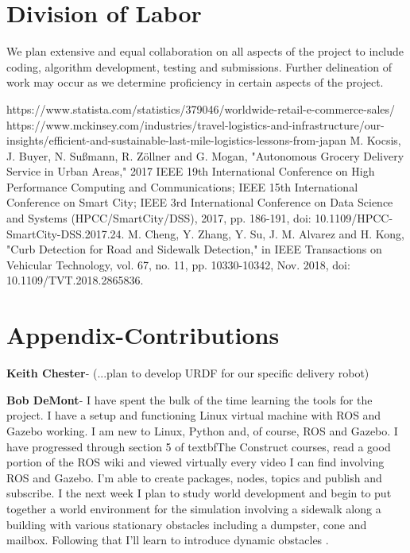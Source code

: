 \documentclass{article}
\begin{document}
\begin{multicols}{2}
\section*{Division of Labor}
We plan extensive and equal collaboration on all aspects of the project to include coding, algorithm development, testing and submissions. Further delineation of work may occur as we determine proficiency in certain aspects of the project.  
\label{References}


\begin{thebibliography}{10}
 https://www.statista.com/statistics/379046/worldwide-retail-e-commerce-sales/
https://www.mckinsey.com/industries/travel-logistics-and-infrastructure/our-insights/efficient-and-sustainable-last-mile-logistics-lessons-from-japan
M. Kocsis, J. Buyer, N. Sußmann, R. Zöllner and G. Mogan, "Autonomous Grocery Delivery Service in Urban Areas," 2017 IEEE 19th International Conference on High Performance Computing and Communications; IEEE 15th International Conference on Smart City; IEEE 3rd International Conference on Data Science and Systems (HPCC/SmartCity/DSS), 2017, pp. 186-191, doi: 10.1109/HPCC-SmartCity-DSS.2017.24.
M. Cheng, Y. Zhang, Y. Su, J. M. Alvarez and H. Kong, "Curb Detection for Road and Sidewalk Detection," in IEEE Transactions on Vehicular Technology, vol. 67, no. 11, pp. 10330-10342, Nov. 2018, doi: 10.1109/TVT.2018.2865836.



\end{thebibliography}
\pagebreak
\section*{Appendix-Contributions}
\noindent \textbf{Keith Chester}-  (...plan to develop URDF for our specific delivery robot)

\bigskip

\noindent \textbf{Bob DeMont}- I have spent the bulk of the time learning the tools for the project.  I have a setup and functioning Linux virtual machine with ROS and Gazebo working.  I am new to Linux, Python and, of course, ROS and Gazebo.  I have progressed through section 5 of textbf{The Construct} courses, read a good portion of the ROS wiki and viewed virtually every video I can find involving ROS and Gazebo.  I'm able to create packages, nodes, topics and publish and subscribe.  I the next week I plan to study world development and begin to put together a world environment for the simulation involving a sidewalk along a building with various stationary obstacles including a dumpster, cone and mailbox.  Following that I'll learn to introduce dynamic obstacles .\\

\end{multicols}
\end{document}
